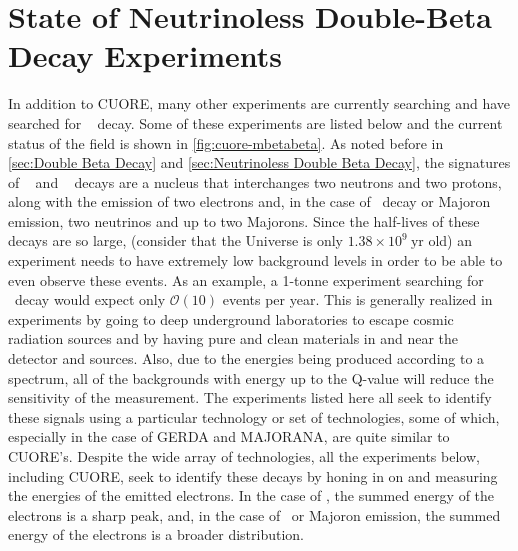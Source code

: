 \section{State of Neutrinoless Double-Beta Decay Experiments}
\label{sec:State of Neutrinoless Double Beta Decay Experiments}
In addition to CUORE, many other experiments are currently searching and have searched for \zeronubb~ decay. Some of these experiments are listed below and the current status of the field is shown in \autoref{fig:cuore-mbetabeta}.
As noted before in \autoref{sec:Double Beta Decay} and \autoref{sec:Neutrinoless Double Beta Decay}, the signatures of \zeronubb~ and \twonubb~ decays are a nucleus that interchanges two neutrons and two protons, along with the emission of two electrons and, in the case of \twonubb~decay or Majoron emission, two neutrinos and up to two Majorons.
Since the half-lives of these decays are so large, (consider that the Universe is only $1.38\times10^{9}~\textrm{yr}$ old) an experiment needs to have extremely low background levels in order to be able to even observe these events.
As an example, a 1-tonne experiment searching for \zeronubb~decay would expect only $\mathcal{O}(10)$ events per year.
This is generally realized in experiments by going to deep underground laboratories to escape cosmic radiation sources and by having pure and clean materials in and near the detector and sources.
Also, due to the energies being produced according to a spectrum, all of the backgrounds with energy up to the Q-value will reduce the sensitivity of the measurement.
The experiments listed here all seek to identify these signals using a particular technology or set of technologies, some of which, especially in the case of GERDA and MAJORANA, are quite similar to CUORE's.
Despite the wide array of technologies, all the experiments below, including CUORE, seek to identify these decays by honing in on and measuring the energies of the emitted electrons.
In the case of \zeronubb, the summed energy of the electrons is a sharp peak, and, in the case of \twonubb~or Majoron emission, the summed energy of the electrons is a broader distribution.


